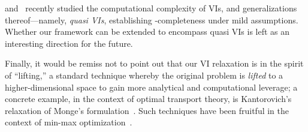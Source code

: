 \citet{Kapron24:Computational} and~\citet{Bernasconi24:Role} recently studied the computational complexity of VIs, and generalizations thereof---namely, \emph{quasi VIs}, establishing \PPAD-completeness under mild assumptions. Whether our framework can be extended to encompass quasi VIs is left as an interesting direction for the future.

Finally, it would be remiss not to point out that our VI relaxation is in the spirit of ``lifting,'' a standard technique whereby the original problem is \emph{lifted} to a higher-dimensional space to gain more analytical and computational leverage; a concrete example, in the context of optimal transport theory, is Kantorovich's relaxation of Monge's formulation~\citep{Billani09:Optimal}. Such techniques have been fruitful in the context of min-max optimization~\citep{Hsieh19:Finding,Domingo-Enrich20:Mean}.